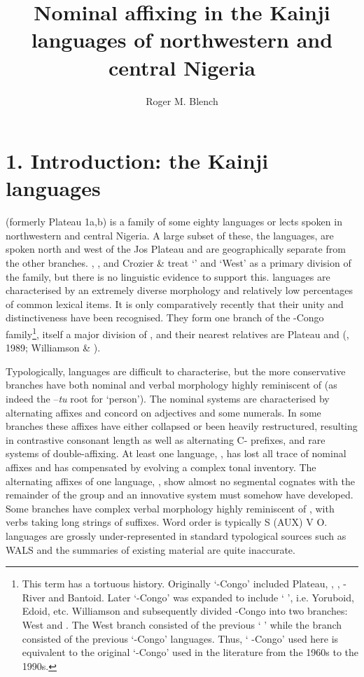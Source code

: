 \documentclass[output=paper]{langsci/langscibook}
\author{Roger M. Blench\affiliation{McDonald Institute for Archaeological Research, University of Cambridge}}
\title{Nominal affixing in the Kainji languages of northwestern and central Nigeria}
\begin{document}

\section{1. Introduction: the Kainji languages} 

 (formerly Plateau 1a,b) is a family of some eighty languages or lects spoken in northwestern and central Nigeria. A large subset of these, the   languages, are spoken north and west of the Jos Plateau and are geographically separate from the other branches. \citet{Rowlands1962}, \citet{Greenberg1963}, \citet{Gerhardt1989} and Crozier \& \citet{Blench1992} treat ‘’ and ‘West’  as a primary division of the family, but there is no linguistic evidence to support this.  languages are characterised by an extremely diverse morphology and relatively low percentages of common lexical items. It is only comparatively recently that their unity and distinctiveness have been recognised. They form one branch of the  -Congo family\footnote{This term has a tortuous history. Originally ‘-Congo’ included Plateau, , , -River and Bantoid. Later ‘-Congo’ was expanded to include ‘ ’, i.e. Yoruboid, Edoid, etc. Williamson and \citet{Blench2000} subsequently divided -Congo into two branches: West and . The West branch consisted of the previous ‘ ’ while the  branch consisted of the previous ‘-Congo’ languages. Thus, ‘ -Congo’ used here is equivalent to the original ‘-Congo’ used in the literature from the 1960s to the 1990s.}, itself a major division of , and their nearest relatives are Plateau and  (\citealt{Williamson1971}, 1989; Williamson \& \citealt{Blench2000}).

Typologically,  languages are difficult to characterise, but the more conservative branches have both nominal and verbal morphology highly reminiscent of  (as indeed the –\textit{tu} root for ‘person’). The nominal systems are characterised by alternating affixes and concord on adjectives and some numerals. In some branches these affixes have either collapsed or been heavily restructured, resulting in contrastive consonant length as well as alternating C- prefixes, and rare systems of double-affixing. At least one language, , has lost all trace of nominal affixes and has compensated by evolving a complex tonal inventory. The alternating affixes of one language, , show almost no segmental cognates with the remainder of the group and an innovative system must somehow have developed. Some branches have complex verbal morphology highly reminiscent of , with verbs taking long strings of suffixes. Word order is typically S (AUX) V O.  languages are grossly under-represented in standard typological sources such as WALS and the summaries of existing material are quite inaccurate.
\end{document}
